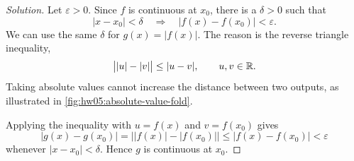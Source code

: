 \begin{proof}[Solution]
  Let $\varepsilon>0$. Since $f$ is continuous at $x_0$, there is a
  $\delta>0$ such that
  \[
    |x-x_0|<\delta
      \quad\Longrightarrow\quad |f(x)-f(x_0)|<\varepsilon.
  \]
  We can use the same $\delta$ for $g(x)=|f(x)|$. The reason is the
  reverse triangle inequality,
  \[
    \bigl||u|-|v|\bigr|\le |u-v|,\qquad u,v\in\mathbb{R}.
  \]
  Taking absolute values cannot increase the distance between two
  outputs, as illustrated in \autoref{fig:hw05:absolute-value-fold}.

  \begin{marginfigure}
    \centering
    
    \caption[Absolute value as a fold of the real line.]{%
      Absolute value folds the negative half-line onto the
      positive half-line. In the illustrated case $u<0<v<|u|$, the
      original distance is $|u|+v$, while the folded distance is
      $|u|-v$. Folding brings the two points closer together.}
    \label{fig:hw05:absolute-value-fold}
  \end{marginfigure}

  Applying the inequality with $u=f(x)$ and $v=f(x_0)$ gives
  \[
    |g(x)-g(x_0)|
      =\bigl||f(x)|-|f(x_0)|\bigr|
      \le |f(x)-f(x_0)|<\varepsilon
  \]
  whenever $|x-x_0|<\delta$. Hence $g$ is continuous at $x_0$.
\end{proof}

